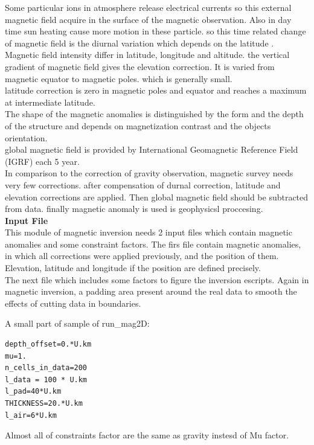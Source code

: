 Some particular ions in atmosphere release electrical currents so this external magnetic field acquire in the surface of the magnetic observation. Also in day time sun heating cause more motion in these particle. so this time related change of magnetic field is the diurnal variation which depends on the latitude . \\
Magnetic field intensity differ in latitude, longitude and altitude. the vertical gradient of magnetic field gives the elevation correction. It is varied from magnetic equator to magnetic poles. which is generally small.\\
latitude correction is zero in magnetic poles and equator and reaches a maximum at intermediate latitude.\\
The shape of the magnetic anomalies is distinguished by the form and the depth of the structure and depends on magnetization contrast and the objects orientation.\\
global magnetic field is provided by International Geomagnetic Reference Field (IGRF) each 5 year.\\

In comparison to the correction of gravity observation, magnetic survey needs very few corrections. after compensation of durnal correction, latitude and elevation corrections are applied. Then global magnetic field should be subtracted from data. finally magnetic anomaly is used is geophysicsl proccesing.\\

\textbf{Input File} \\

This module of magnetic inversion needs 2 input files which contain magnetic anomalies and some constraint factors. The firs file contain magnetic anomalies, in which all corrections were applied previously, and the position of them. Elevation, latitude and longitude if the position are defined precisely.\\
The next file which includes some factors to figure the inversion escripts. 
Again in magnetic inversion, a padding area present around the real data to smooth the effects of cutting data in boundaries.
 
A small part of sample of run_mag2D:\\
\begin{verbatim}
depth_offset=0.*U.km
mu=1.
n_cells_in_data=200
l_data = 100 * U.km
l_pad=40*U.km
THICKNESS=20.*U.km
l_air=6*U.km
\end{verbatim}

Almost all of constraints factor are the same as gravity instesd of Mu factor.\\

